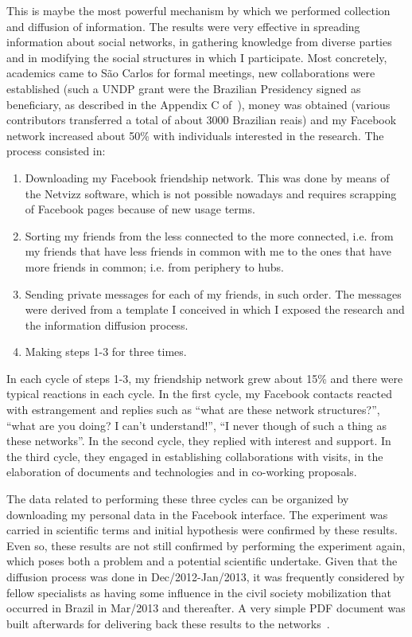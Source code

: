 \documentclass[a4paper]{article}
\begin{document}
This is maybe the most powerful mechanism by which we performed collection and diffusion of information.
The results were very effective in spreading information about social networks,
in gathering knowledge from diverse parties and in modifying the social structures
in which I participate.
Most concretely, academics came to São Carlos for formal meetings,
new collaborations were established (such a UNDP grant were the Brazilian Presidency signed as beneficiary,
as described in the Appendix C of~\cite{thesis}),
money was obtained (various contributors transferred a total of about 3000 Brazilian reais)
and my Facebook network increased about 50\% with individuals interested in the research.
The process consisted in:
\begin{enumerate}
	\item Downloading my Facebook friendship network. This was done by means of the Netvizz software,
		which is not possible nowadays and requires scrapping of Facebook pages because of new usage terms.
	\item Sorting my friends from the less connected to the more connected, i.e. from my friends that have less friends in common with me to the ones that have more friends in common; i.e. from periphery to hubs.
	\item Sending private messages for each of my friends, in such order.
		The messages were derived from a template I conceived in which I exposed the research and the information diffusion process.
	\item Making steps 1-3 for three times.
\end{enumerate}
In each cycle of steps 1-3, my friendship network grew about 15\% and there were typical reactions in each cycle.
In the first cycle, my Facebook contacts reacted with estrangement and replies such as ``what are these network structures?'',
``what are you doing? I can't understand!'', ``I never though of such a thing as these networks''.
In the second cycle, they replied with interest and support.
In the third cycle, they engaged in establishing collaborations with visits, in the elaboration of documents and technologies and
in co-working proposals.

The data related to performing these three cycles can be organized by downloading my personal data in the Facebook interface.
The experiment was carried in scientific terms and initial hypothesis were confirmed by these results.
Even so, these results are not still confirmed by performing the experiment again,
which poses both a problem and a potential scientific undertake.
Given that the diffusion process was done in Dec/2012-Jan/2013, it was frequently considered by fellow specialists as
having some influence in the civil society mobilization that occurred in Brazil in Mar/2013 and thereafter.
A very simple PDF document was built afterwards for delivering back these results to the networks~\cite{docDif}.
\end{document}
